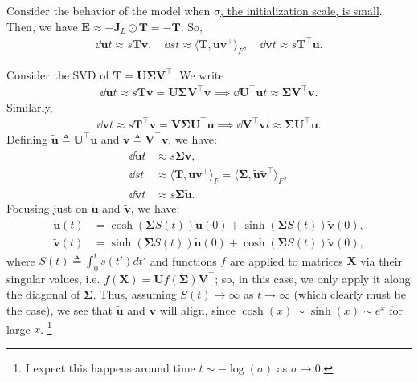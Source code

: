 \documentclass{article}
\begin{document}
Consider the behavior of the model when \underline{$\sigma$, the initialization scale, is small}.
Then, we have $\bm{E} \approx - \bm{J}_L \odot \bm{T} = -\bm{T}$.
So,
\begin{align*}
    \dd{\bm{u}}{t} \approx s \bm{T} \bm{v}, \quad
    \dd{s}{t} \approx \langle \bm{T}, \bm{u} \bm{v}^\top \rangle_F, \quad
    \dd{\bm{v}}{t} \approx s \bm{T}^\top \bm{u}.
\end{align*}

Consider the SVD of $\bm{T} = \bm{U} \bm{\Sigma} \bm{V}^\top$.
We write
\begin{align*}
    \dd{\bm{u}}{t} \approx s \bm{T} \bm{v}
    = \bm{U} \bm{\Sigma} \bm{V}^\top \bm{v}
    \implies
    \dd{\bm{U}^\top \bm{u}}{t} \approx \bm{\Sigma} \bm{V}^\top \bm{v}.
\end{align*}
Similarly,
\begin{align*}
    \dd{\bm{v}}{t} \approx s \bm{T}^\top \bm{v}
    = \bm{V} \bm{\Sigma} \bm{U}^\top \bm{u}
    \implies
    \dd{\bm{V}^\top \bm{v}}{t} \approx \bm{\Sigma} \bm{U}^\top \bm{u}.
\end{align*}
Defining $\tilde{\bm{u}} \triangleq \bm{U}^\top \bm{u}$ and $\tilde{\bm{v}} \triangleq \bm{V}^\top \bm{v}$, we have:
\begin{align*}
    \dd{\tilde{\bm{u}}}{t} &\approx s \bm{\Sigma} \tilde{\bm{v}}, \\
    \dd{s}{t} &\approx \langle \bm{T}, \bm{u} \bm{v}^\top \rangle_F = \langle \bm{\Sigma}, \tilde{\bm{u}} \tilde{\bm{v}}^\top \rangle_F, \\
    \dd{\tilde{\bm{v}}}{t} &\approx s \bm{\Sigma} \tilde{\bm{u}}.
\end{align*}
Focusing just on $\tilde{\bm{u}}$ and $\tilde{\bm{v}}$, we have:
\begin{align*}
    \tilde{\bm{u}}(t) &= \cosh( \bm{\Sigma} S(t) ) \tilde{\bm{u}}(0) + \sinh( \bm{\Sigma} S(t) ) \tilde{\bm{v}}(0), \\
    \tilde{\bm{v}}(t) &= \sinh( \bm{\Sigma} S(t) ) \tilde{\bm{u}}(0) + \cosh( \bm{\Sigma} S(t) ) \tilde{\bm{v}}(0),
\end{align*}
where $S(t) \triangleq \int_0^t s(t') dt'$ and functions $f$ are applied to matrices $\bm{X}$ via their singular values, i.e. $f(\bm{X}) = \bm{U} f(\bm{\Sigma}) \bm{V}^\top$; so, in this case, we only apply it along the diagonal of $\bm{\Sigma}$.
Thus, assuming $S(t) \to \infty$ as $t \to \infty$ (which clearly must be the case), we see that $\tilde{\bm{u}}$ and $\tilde{\bm{v}}$ will align, since $\cosh(x) \sim \sinh(x) \sim e^x$ for large $x$.
\footnote{I expect this happens around time $t \sim - \log(\sigma)$ as $\sigma \to 0$.}
\end{document}
